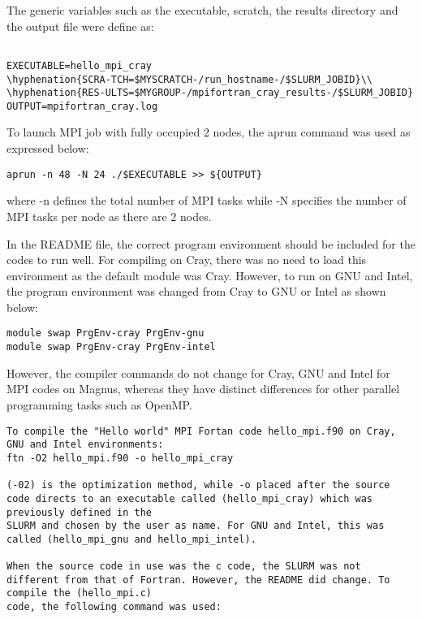\documentclass[journal]{IEEEtran}
\begin{document}
{The generic variables such as the executable, scratch, the results directory and the output file were define as:

\begin{verbatim}

EXECUTABLE=hello_mpi_cray
\hyphenation{SCRA-TCH=$MYSCRATCH-/run_hostname-/$SLURM_JOBID}\\
\hyphenation{RES-ULTS=$MYGROUP-/mpifortran_cray_results-/$SLURM_JOBID}
OUTPUT=mpifortran_cray.log 

\end{verbatim}

To launch MPI job with fully occupied 2 nodes, the aprun command was used as expressed below:

\begin{verbatim}
aprun -n 48 -N 24 ./$EXECUTABLE >> ${OUTPUT}
\end{verbatim}

where -n defines the total number of MPI tasks while -N specifies the number of MPI tasks per node as there are 2 nodes.

In the README file, the correct program environment should be included for the codes to run well. For compiling on Cray, there was no need to load
this environment as the default module was Cray. However, to run on GNU and Intel, the program environment was changed from Cray to GNU or Intel as
shown below:

\begin{verbatim}
module swap PrgEnv-cray PrgEnv-gnu
module swap PrgEnv-cray PrgEnv-intel
\end{verbatim}

However, the compiler commands do not change for Cray, GNU and Intel for MPI codes on Magnus, whereas they have distinct differences for other parallel
programming tasks such as OpenMP.

\begin{verbatim}
To compile the "Hello world" MPI Fortan code hello_mpi.f90 on Cray, GNU and Intel environments:
ftn -O2 hello_mpi.f90 -o hello_mpi_cray

(-02) is the optimization method, while -o placed after the source code directs to an executable called (hello_mpi_cray) which was previously defined in the
SLURM and chosen by the user as name. For GNU and Intel, this was called (hello_mpi_gnu and hello_mpi_intel). 

When the source code in use was the c code, the SLURM was not different from that of Fortran. However, the README did change. To compile the (hello_mpi.c) 
code, the following command was used: 


\end{verbatim}}
\end{document}
